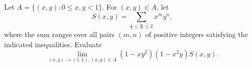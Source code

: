 Let $A=\{(x,y):0\leq x,y<1\}$.  For $(x,y)\in A$, let
\[S(x,y) = \sum_{\frac{1}{2}\leq \frac{m}{n}\leq 2} x^m y^n,\]
where the sum ranges over all pairs $(m,n)$ of positive integers
satisfying the indicated inequalities.  Evaluate
\[\lim_{(x,y)\rightarrow (1,1), (x,y)\in A} (1-xy^2)(1-x^2y)S(x,y).\]
